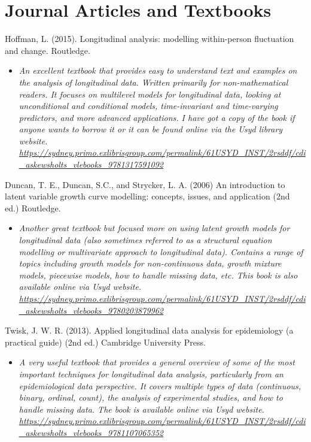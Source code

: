 \documentclass[
]{book}
\providecommand{\tightlist}{%
  \setlength{\itemsep}{0pt}\setlength{\parskip}{0pt}}
\begin{document}
\hypertarget{journal-articles-and-textbooks-2}{%
\section{Journal Articles and Textbooks}\label{journal-articles-and-textbooks-2}}

Hoffman, L. (2015). Longitudinal analysis: modelling within-person fluctuation and change. Routledge.

\begin{itemize}
\tightlist
\item
  \emph{An excellent textbook that provides easy to understand text and examples on the analysis of longitudinal data. Written primarily for non-mathematical readers. It focuses on multilevel models for longitudinal data, looking at unconditional and conditional models, time-invariant and time-varying predictors, and more advanced applications. I have got a copy of the book if anyone wants to borrow it or it can be found online via the Usyd library website. \url{https://sydney.primo.exlibrisgroup.com/permalink/61USYD_INST/2rsddf/cdi_askewsholts_vlebooks_9781317591092} }
\end{itemize}

Duncan, T. E., Duncan, S.C., and Strycker, L. A. (2006) An introduction to latent variable growth curve modelling: concepts, issues, and application (2nd ed.) Routledge.

\begin{itemize}
\tightlist
\item
  \emph{Another great textbook but focused more on using latent growth models for longitudinal data (also sometimes referred to as a structural equation modelling or multivariate approach to longitudinal data). Contains a range of topics including growth models for non-continuous data, growth mixture models, piecewise models, how to handle missing data, etc. This book is also available online via Usyd website. \url{https://sydney.primo.exlibrisgroup.com/permalink/61USYD_INST/2rsddf/cdi_askewsholts_vlebooks_9780203879962} }
\end{itemize}

Twisk, J. W. R. (2013). Applied longitudinal data analysis for epidemiology (a practical guide) (2nd ed.) Cambridge University Press.

\begin{itemize}
\tightlist
\item
  \emph{A very useful textbook that provides a general overview of some of the most important techniques for longitudinal data analysis, particularly from an epidemiological data perspective. It covers multiple types of data (continuous, binary, ordinal, count), the analysis of experimental studies, and how to handle missing data. The book is available online via Usyd website. \url{https://sydney.primo.exlibrisgroup.com/permalink/61USYD_INST/2rsddf/cdi_askewsholts_vlebooks_9781107065352} }
\end{itemize}
\end{document}

